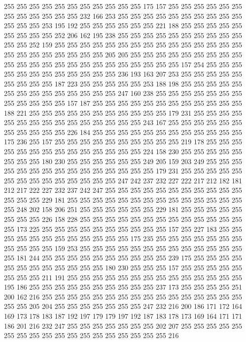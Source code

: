 255 255 255 255 255 255 255 255 255 255 255 175 157 255 255 255 255 255 255 255
255 255 255 255 255 232 166 253 255 255 255 255 255 255 255 255 255 255 255 255
255 253 195 192 255 255 255 255 255 255 221 188 255 255 255 255 255 255 255 255
255 252 206 162 195 238 255 255 255 255 255 255 255 255 255 255 255 255 252 159
255 255 255 255 255 255 255 255 255 255 255 255 255 255 255 255 255 255 255 255
255 255 255 205 205 255 255 255 255 255 255 255 255 255 255 255 255 255 255 255
255 255 255 255 255 255 255 255 157 254 255 255 255 255 255 255 255 255 255 255
255 255 236 193 163 207 253 255 255 255 255 255 255 255 255 255 187 223 255 255
255 255 255 253 188 198 255 255 255 255 255 255 255 255 255 255 255 255 255 255
247 160 238 255 255 255 255 255 255 255 255 255 255 255 255 157 187 255 255 255
255 255 255 255 255 255 255 255 255 188 221 255 255 255 255 255 255 255 255 255
255 255 179 231 255 255 255 255 255 255 255 255 255 255 255 255 255 255 255 243
167 255 255 255 255 255 255 255 255 255 255 255 226 184 255 255 255 255 255 255
255 255 255 255 255 255 175 236 255 157 255 255 255 255 255 255 255 255 255 255
219 178 255 255 255 255 255 255 255 255 255 255 255 255 255 255 224 158 230 255
255 255 255 255 255 255 255 180 230 255 255 255 255 255 255 249 205 159 203 249
255 255 255 255 255 255 255 255 255 255 255 255 255 255 255 179 231 255 255 255
255 255 255 255 255 255 255 255 255 255 255 247 242 237 232 227 222 217 212 182
181 212 217 222 227 232 237 242 247 255 255 255 255 255 255 255 255 255 255 255
255 255 255 229 181 255 255 255 255 255 255 255 255 255 255 255 255 255 255 255
248 202 158 206 251 255 255 255 255 255 255 229 181 255 255 255 255 255 255 255
255 226 158 228 255 255 255 255 255 255 255 255 255 255 255 255 255 255 173 225
255 255 255 255 255 255 255 255 255 255 157 255 227 183 255 255 255 255 255 255
255 255 255 255 255 255 175 235 255 255 255 255 255 255 255 255 255 255 255 159
253 255 255 255 255 255 255 255 255 255 255 255 255 255 255 181 244 255 255 255
255 255 255 255 255 255 255 239 175 255 255 255 255 255 255 255 255 255 255 255
255 180 230 255 255 255 157 255 255 255 255 255 255 255 255 211 191 255 255 255
255 255 255 255 255 255 255 255 255 255 255 195 186 255 255 255 255 255 255 255
255 255 255 237 173 255 255 255 255 251 200 162 216 255 255 255 255 255 255 255
255 255 255 255 255 255 255 255 255 255 255 205 204 255 255 255 255 255 255 255
247 232 216 200 186 171 172 164 169 173 178 183 187 192 197 179 179 197 192 187
183 178 173 169 164 171 171 186 201 216 232 247 255 255 255 255 255 255 255 202
207 255 255 255 255 255 255 255 255 255 255 255 255 255 255 255 255 255 255 216

